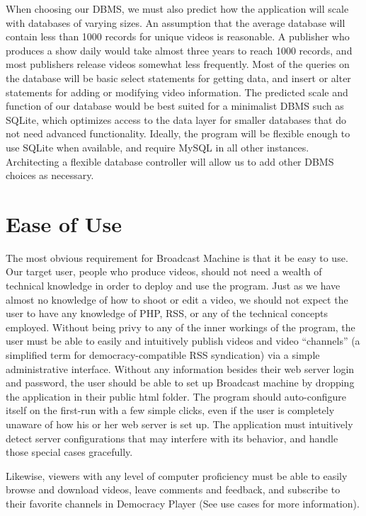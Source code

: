\documentclass[a4paper,12pt]{report}
\begin{document}
When choosing our DBMS, we must also predict how the application will scale with databases of varying sizes. 
An assumption that the average database will contain less than 1000 records for unique videos is reasonable. A publisher who produces a show daily would take almost three years to reach 1000 records, and most publishers release videos somewhat less frequently. 
Most of the queries on the database will be basic select statements for getting data, and insert or alter statements for adding or modifying video information. 
The predicted scale and function of our database would be best suited for a minimalist DBMS such as SQLite, which optimizes access to the data layer for smaller databases that do not need advanced functionality. 
Ideally, the program will be flexible enough to use SQLite when available, and require MySQL in all other instances. 
Architecting a flexible database controller will allow us to add other DBMS choices as necessary.

\section{Ease of Use}

	The most obvious requirement for Broadcast Machine is that it be easy to use. 
Our target user, people who produce videos, should not need a wealth of technical knowledge in order to deploy and use the program. 
Just as we have almost no knowledge of how to shoot or edit a video, we should not expect the user to have any knowledge of PHP, RSS, or any of the technical concepts employed. 
Without being privy to any of the inner workings of the program, the user must be able to easily and intuitively publish videos and video “channels” (a simplified term for democracy-compatible RSS syndication) via a simple administrative interface. 
Without any information besides their web server login and password, the user should be able to set up Broadcast machine by dropping the application in their public html folder. 
The program should auto-configure itself on the first-run with a few simple clicks, even if the user is completely unaware of how his or her web server is set up. 
The application must intuitively detect server configurations that may interfere with its behavior, and handle those special cases gracefully.

Likewise, viewers with any level of computer proficiency must be able to easily browse and download videos, leave comments and feedback, and subscribe to their favorite channels in Democracy Player (See use cases for more information).
\end{document}
